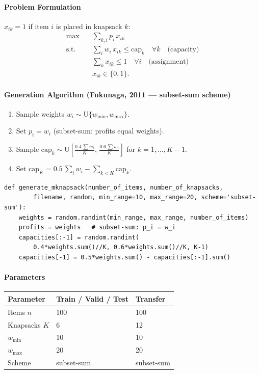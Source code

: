 \paragraph{Problem Formulation}

$x_{ik} = 1$ if item $i$ is placed in knapsack $k$:
\begin{align}
    \max\quad & \sum_{k,i} p_i\,x_{ik} \\
    \text{s.t.}\quad
    & \sum_i w_i\,x_{ik} \leq \mathrm{cap}_k \quad\forall k \quad\text{(capacity)}\\
    & \sum_k x_{ik} \leq 1 \quad\forall i \quad\text{(assignment)}\\
    & x_{ik} \in \{0,1\}.
\end{align}

\paragraph{Generation Algorithm (Fukunaga, 2011 --- subset-sum scheme)}

\begin{enumerate}
    \item Sample weights $w_i \sim \mathrm{U}\{w_{\min}, w_{\max}\}$.
    \item Set $p_i = w_i$ (subset-sum: profits equal weights).
    \item Sample $\mathrm{cap}_k \sim \mathrm{U}\!\left[\frac{0.4\,\sum w_i}{K},\, \frac{0.6\,\sum w_i}{K}\right]$ for $k = 1,\ldots,K{-}1$.
    \item Set $\mathrm{cap}_K = 0.5\,\sum_i w_i - \sum_{k<K} \mathrm{cap}_k$.
\end{enumerate}

\begin{lstlisting}
def generate_mknapsack(number_of_items, number_of_knapsacks,
        filename, random, min_range=10, max_range=20, scheme='subset-sum'):
    weights = random.randint(min_range, max_range, number_of_items)
    profits = weights   # subset-sum: p_i = w_i
    capacities[:-1] = random.randint(
        0.4*weights.sum()//K, 0.6*weights.sum()//K, K-1)
    capacities[-1] = 0.5*weights.sum() - capacities[:-1].sum()
\end{lstlisting}

\paragraph{Parameters}

\begin{tabular}{lll}
\toprule
Parameter & Train / Valid / Test & Transfer \\
\midrule
Items $n$          & 100 & 100 \\
Knapsacks $K$      & 6   & 12  \\
$w_{\min}$         & 10  & 10  \\
$w_{\max}$         & 20  & 20  \\
Scheme             & subset-sum & subset-sum \\
\bottomrule
\end{tabular}

